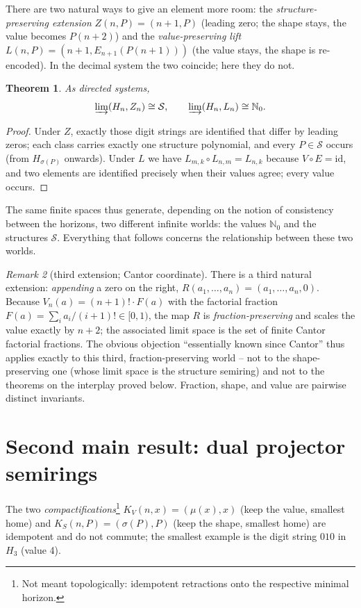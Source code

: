\documentclass[11pt]{article}
\newtheorem{satz}{Theorem}[section]
\theoremstyle{definition}
\theoremstyle{remark}
\newtheorem{bemerkung}[satz]{Remark}
\newcommand{\Struk}{\mathcal S}
\newcommand{\NN}{\mathbb N_0}
\newcommand{\KV}{K_V}
\newcommand{\KS}{K_S}
\begin{document}
There are two natural ways to give an element more room: the
\emph{structure-preserving extension} $Z(n,P)=(n+1,P)$ (leading
zero; the shape stays, the value becomes $P(n+2)$) and the
\emph{value-preserving lift} $L(n,P)=(n+1,E_{n+1}(P(n+1)))$ (the
value stays, the shape is re-encoded). In the decimal system the
two coincide; here they do not.

\begin{satz}\label{satz:limits}
As directed systems,
\[
\varinjlim(H_n,Z_n)\cong\Struk,
\qquad
\varinjlim(H_n,L_n)\cong\NN .
\]
\end{satz}

\begin{proof}
Under $Z$, exactly those digit strings are identified that differ
by leading zeros; each class carries exactly one structure
polynomial, and every $P\in\Struk$ occurs (from $H_{\sigma(P)}$
onwards). Under $L$ we have $L_{m,k}\circ L_{n,m}=L_{n,k}$ because
$V\circ E=\mathrm{id}$, and two elements are identified precisely
when their values agree; every value occurs.
\end{proof}

The same finite spaces thus generate, depending on the notion of
consistency between the horizons, two different infinite worlds:
the values $\NN$ and the structures $\Struk$. Everything that
follows concerns the relationship between these two worlds.

\begin{bemerkung}[third extension; Cantor coordinate]
There is a third natural extension: \emph{appending} a zero on the
right, $R(a_1,\ldots,a_n)=(a_1,\ldots,a_n,0)$. Because
$V_n(a)=(n+1)!\cdot F(a)$ with the factorial fraction
$F(a)=\sum_i a_i/(i+1)!\in[0,1)$, the map $R$ is
\emph{fraction-preserving} and scales the value exactly by $n+2$;
the associated limit space is the set of finite Cantor factorial
fractions. The obvious objection ``essentially known since
Cantor'' thus applies exactly to this third, fraction-preserving
world -- not to the shape-preserving one (whose limit space is the
structure semiring) and not to the theorems on the interplay proved
below. Fraction, shape, and value are pairwise distinct invariants.
\end{bemerkung}

\section{Second main result: dual projector semirings}

The two \emph{compactifications}\footnote{Not meant topologically:
idempotent retractions onto the respective minimal horizon.}
$\KV(n,x)=(\mu(x),x)$ (keep the value, smallest home) and
$\KS(n,P)=(\sigma(P),P)$ (keep the shape, smallest home) are
idempotent and do not commute; the smallest example is the digit
string $010$ in $H_3$ (value 4).
\end{document}
